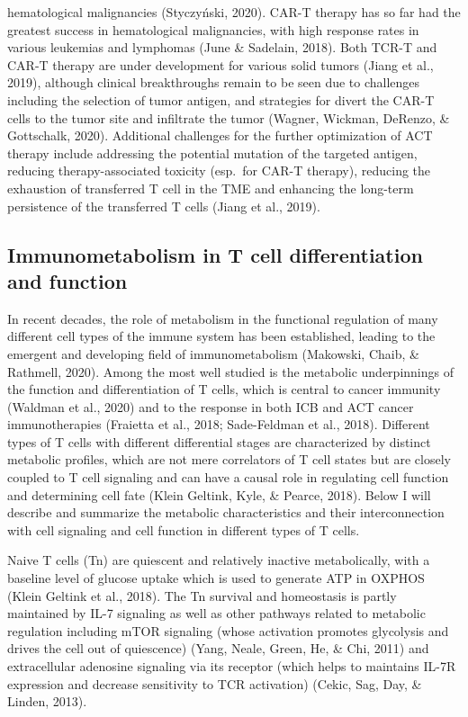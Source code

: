 \documentclass[12pt,twoside,openany,\mydriver]{thesis}  %
\begin{document}
hematological malignancies (Styczyński, 2020). CAR-T therapy has so far had the greatest success in hematological malignancies, with high response rates in various leukemias and lymphomas (June \& Sadelain, 2018). Both TCR-T and CAR-T therapy are under development for various solid tumors (Jiang et al., 2019), although clinical breakthroughs remain to be seen due to challenges including the selection of tumor antigen, and strategies for divert the CAR-T cells to the tumor site and infiltrate the tumor (Wagner, Wickman, DeRenzo, \& Gottschalk, 2020). Additional challenges for the further optimization of ACT therapy include addressing the potential mutation of the targeted antigen, reducing therapy-associated toxicity (esp.~for CAR-T therapy), reducing the exhaustion of transferred T cell in the TME and enhancing the long-term persistence of the transferred T cells (Jiang et al., 2019).

\hypertarget{intro-t-metab}{%
\subsection{Immunometabolism in T cell differentiation and function}\label{intro-t-metab}}

In recent decades, the role of metabolism in the functional regulation of many different cell types of the immune system has been established, leading to the emergent and developing field of immunometabolism (Makowski, Chaib, \& Rathmell, 2020). Among the most well studied is the metabolic underpinnings of the function and differentiation of T cells, which is central to cancer immunity (Waldman et al., 2020) and to the response in both ICB and ACT cancer immunotherapies (Fraietta et al., 2018; Sade-Feldman et al., 2018). Different types of T cells with different differential stages are characterized by distinct metabolic profiles, which are not mere correlators of T cell states but are closely coupled to T cell signaling and can have a causal role in regulating cell function and determining cell fate (Klein Geltink, Kyle, \& Pearce, 2018). Below I will describe and summarize the metabolic characteristics and their interconnection with cell signaling and cell function in different types of T cells.

Naive T cells (Tn) are quiescent and relatively inactive metabolically, with a baseline level of glucose uptake which is used to generate ATP in OXPHOS (Klein Geltink et al., 2018). The Tn survival and homeostasis is partly maintained by IL-7 signaling as well as other pathways related to metabolic regulation including mTOR signaling (whose activation promotes glycolysis and drives the cell out of quiescence) (Yang, Neale, Green, He, \& Chi, 2011) and extracellular adenosine signaling via its receptor (which helps to maintains IL-7R expression and decrease sensitivity to TCR activation) (Cekic, Sag, Day, \& Linden, 2013).
\end{document}
